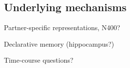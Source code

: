 \documentclass[11pt, floatsintext, jou]{apa6}
\begin{document}

\subsection{Underlying mechanisms}

Partner-specific representations, N400? \cite{TesinkEtAl09_MeaningfMRI,VanBerkum08_NeuralSpeakerMessage}

Declarative memory (hippocampus?) \cite{DuffBrownSchmidt12_Hippocampus}

Time-course questions? \cite{HortonGerrig16_MemoryBasedReview}
\end{document}
